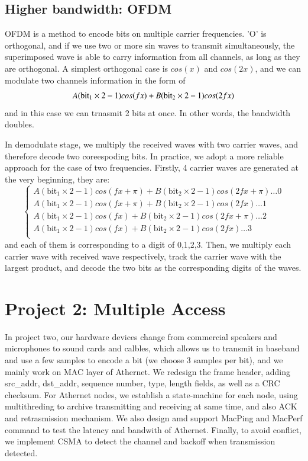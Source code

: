 \documentclass[11pt, conference]{IEEEtran}
\begin{document}
\subsection{Higher bandwidth: OFDM}

OFDM is a method to encode bits on multiple carrier frequencies. 'O' is orthogonal, and if we use two or more sin waves to transmit simultaneously,
the superimposed wave is able to carry information from all channels, as long as they are orthogonal. A simplest orthogonal case is $cos(x)$ and $cos(2x)$,
and we can modulate two channels information in the form of 
\[
    A(\text{bit}_1 \times 2 - 1)cos(fx) + B(\text{bit}_2 \times 2 - 1)cos(2fx)\\
\]
and in this case we can trnasmit 2 bits at once. In other words, the bandwidth doubles.

In demodulate stage, we multiply the received waves with two carrier waves, and therefore decode two coreespoding bits.
In practice, we adopt a more reliable approach for the case of two frequencies. Firstly, 4 carrier waves are generated at the
very beginning, they are:
\[
    \begin{cases}
    A(\text{bit}_1 \times 2 - 1)cos(fx+\pi) + B(\text{bit}_2 \times 2 - 1)cos(2fx + \pi) \dots 0 \\
    A(\text{bit}_1 \times 2 - 1)cos(fx+\pi) + B(\text{bit}_2 \times 2 - 1)cos(2fx) \dots 1\\
    A(\text{bit}_1 \times 2 - 1)cos(fx) + B(\text{bit}_2 \times 2 - 1)cos(2fx + \pi) \dots 2\\
    A(\text{bit}_1 \times 2 - 1)cos(fx) + B(\text{bit}_2 \times 2 - 1)cos(2fx) \dots 3\\
    \end{cases}
\]
and each of them is corresponding to a digit of 0,1,2,3. Then, we multiply each carrier wave with received wave respectively, track the carrier wave with the largest product, and decode the two
bits as the corresponding digits of the waves.
\section{Project 2: Multiple Access}

In project two, our hardware devices change from commercial speakers and microphones to sound cards and calbles, which allows us to transmit in baseband and use a few samples to 
encode a bit (we choose 3 samples per bit), and we mainly work on MAC layer of Athernet. We redesign the frame header, adding src\_addr, dst\_addr, sequence number, type, length fields,
as well as a CRC checksum. For Athernet nodes, we establish a state-machine for each node, using multithreding to archive transmitting and receiving at same time, and also ACK and retrasmission
mechanism. We also design amd support MacPing and MacPerf command to test the latency and bandwith of Athernet. Finally, to avoid conflict, we implement CSMA to detect the channel and backoff when transmission detected.
\end{document}

